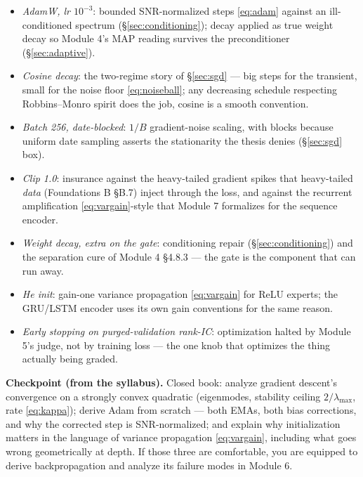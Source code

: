 \documentclass[11pt]{article}
\numberwithin{equation}{section}
\theoremstyle{plain}
\theoremstyle{definition}
\theoremstyle{remark}
\newcommand{\lmax}{\lambda_{\max}}
\begin{document}
\begin{itemize}[leftmargin=2em,itemsep=0.18em]
\item \emph{AdamW, lr $10^{-3}$}: bounded SNR-normalized steps \eqref{eq:adam} against an ill-conditioned spectrum (\S\ref{sec:conditioning}); decay applied as true weight decay so Module 4's MAP reading survives the preconditioner (\S\ref{sec:adaptive}).
\item \emph{Cosine decay}: the two-regime story of \S\ref{sec:sgd} --- big steps for the transient, small for the noise floor \eqref{eq:noiseball}; any decreasing schedule respecting Robbins--Monro spirit does the job, cosine is a smooth convention.
\item \emph{Batch 256, date-blocked}: $1/B$ gradient-noise scaling, with blocks because uniform date sampling asserts the stationarity the thesis denies (\S\ref{sec:sgd} box).
\item \emph{Clip 1.0}: insurance against the heavy-tailed gradient spikes that heavy-tailed \emph{data} (Foundations B \S B.7) inject through the loss, and against the recurrent amplification \eqref{eq:vargain}-style that Module 7 formalizes for the sequence encoder.
\item \emph{Weight decay, extra on the gate}: conditioning repair (\S\ref{sec:conditioning}) and the separation cure of Module 4 \S4.8.3 --- the gate is the component that can run away.
\item \emph{He init}: gain-one variance propagation \eqref{eq:vargain} for ReLU experts; the GRU/LSTM encoder uses its own gain conventions for the same reason.
\item \emph{Early stopping on purged-validation rank-IC}: optimization halted by Module 5's judge, not by training loss --- the one knob that optimizes the thing actually being graded.
\end{itemize}

\medskip
\noindent\textbf{Checkpoint (from the syllabus).} Closed book: analyze gradient descent's convergence on a strongly convex quadratic (eigenmodes, stability ceiling $2/\lmax$, rate \eqref{eq:kappa}); derive Adam from scratch --- both EMAs, both bias corrections, and why the corrected step is SNR-normalized; and explain why initialization matters in the language of variance propagation \eqref{eq:vargain}, including what goes wrong geometrically at depth. If those three are comfortable, you are equipped to derive backpropagation and analyze its failure modes in Module 6.

\end{document}
